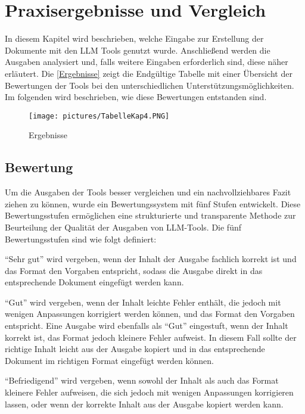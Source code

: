 
\chapter{Praxisergebnisse und Vergleich} 

In diesem Kapitel wird beschrieben, welche Eingabe zur Erstellung der Dokumente mit den LLM Tools 
genutzt wurde. Anschließend werden die Ausgaben analysiert und, falls weitere Eingaben erforderlich sind, 
diese näher erläutert. Die \autoref{Ergebnisse} zeigt die Endgültige Tabelle mit einer Übersicht der Bewertungen 
der Tools bei den unterschiedlichen Unterstützungsmöglichkeiten. Im folgenden wird beschrieben, wie diese Bewertungen 
entstanden sind.

\begin{figure}[H]
    \centering
    \texttt{[image: pictures/TabelleKap4.PNG]}
    \caption{Ergebnisse}
    \label{Ergebnisse}
\end{figure}

\section*{Bewertung}

Um die Ausgaben der Tools besser vergleichen und ein nachvollziehbares Fazit ziehen zu können, wurde ein Bewertungssystem 
mit fünf Stufen entwickelt. Diese Bewertungsstufen ermöglichen eine strukturierte und transparente Methode zur Beurteilung 
der Qualität der Ausgaben von LLM-Tools. Die fünf Bewertungsstufen sind wie folgt definiert:

``Sehr gut'' wird vergeben, wenn der Inhalt der Ausgabe fachlich korrekt ist und das Format den Vorgaben entspricht, sodass 
die Ausgabe direkt in das entsprechende Dokument eingefügt werden kann.

\clearpage

``Gut'' wird vergeben, wenn der Inhalt leichte Fehler enthält, die jedoch mit wenigen Anpassungen korrigiert 
werden können, und das Format den Vorgaben entspricht. Eine Ausgabe wird ebenfalls als ``Gut'' eingestuft, wenn der Inhalt 
korrekt ist, das Format jedoch kleinere Fehler aufweist. In diesem Fall sollte der richtige Inhalt leicht aus der Ausgabe 
kopiert und in das entsprechende Dokument im richtigen Format eingefügt werden können.

``Befriedigend'' wird vergeben, wenn sowohl der Inhalt als auch das Format kleinere Fehler aufweisen, die sich 
jedoch mit wenigen Anpassungen korrigieren lassen, oder wenn der korrekte Inhalt aus der Ausgabe kopiert werden kann.


